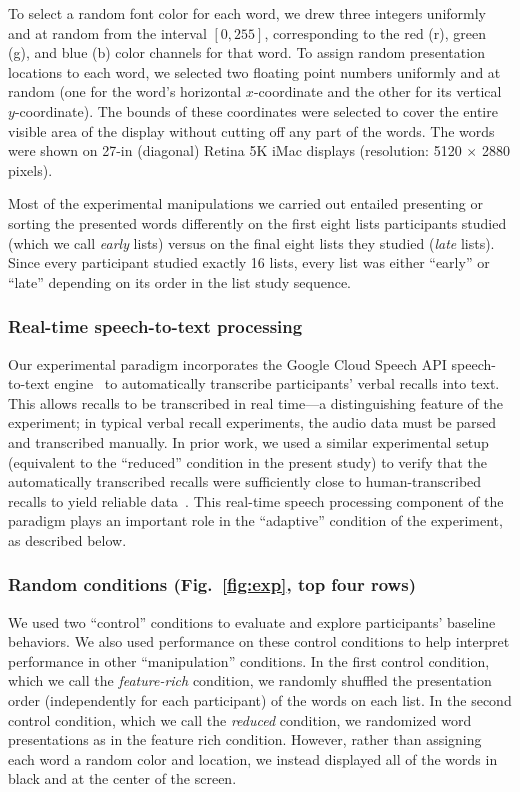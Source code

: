\documentclass[11pt]{article}
\begin{document}
To select a random font color for each word, we drew three integers uniformly
and at random from the interval $\left[0, 255\right]$, corresponding to the red
(r), green (g), and blue (b) color channels for that word. To assign random
presentation locations to each word, we selected two floating point numbers
uniformly and at random (one for the word's horizontal $x$-coordinate and the
other for its vertical $y$-coordinate). The bounds of these coordinates were
selected to cover the entire visible area of the display without cutting off
any part of the words. The words were shown on 27-in (diagonal) Retina 5K iMac
displays (resolution: 5120 $\times$ 2880 pixels).

Most of the experimental manipulations we carried out entailed presenting or
sorting the presented words differently on the first eight lists participants
studied (which we call \textit{early} lists) versus on the final eight lists
they studied (\textit{late} lists). Since every participant studied exactly 16
lists, every list was either ``early'' or ``late'' depending on its order in
the list study sequence.


\subsubsection*{Real-time speech-to-text processing}

Our experimental paradigm incorporates the Google Cloud Speech API
speech-to-text engine~\citep{HalpEtal16} to automatically transcribe
participants' verbal recalls into text. This allows recalls to be transcribed
in real time---a distinguishing feature of the experiment; in typical verbal
recall experiments, the audio data must be parsed and transcribed manually. In
prior work, we used a similar experimental setup (equivalent to the ``reduced''
condition in the present study) to verify that the automatically transcribed
recalls were sufficiently close to human-transcribed recalls to yield reliable
data~\citep{ZimaEtal18}. This real-time speech processing component of the
paradigm plays an important role in the ``adaptive'' condition of the
experiment, as described below.

\subsubsection*{Random conditions (Fig.~\ref{fig:exp}, top four rows)}

We used two ``control'' conditions to evaluate and explore participants'
baseline behaviors. We also used performance on these control conditions to
help interpret performance in other ``manipulation'' conditions. In the first
control condition, which we call the \textit{feature-rich} condition, we
randomly shuffled the presentation order (independently for each participant)
of the words on each list. In the second control condition, which we call the
\textit{reduced} condition, we randomized word presentations as in the feature
rich condition. However, rather than assigning each word a random color and
location, we instead displayed all of the words in black and at the center of
the screen.
\end{document}
